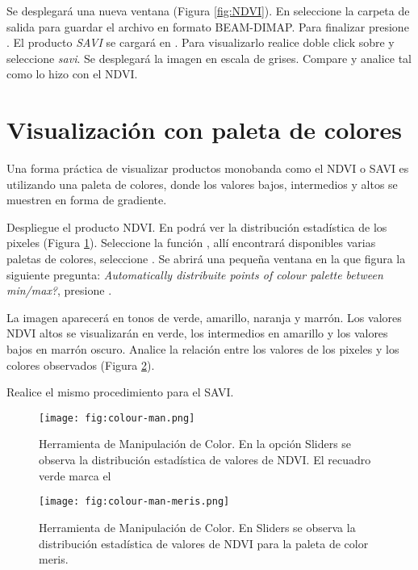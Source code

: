 Se desplegará una nueva ventana (Figura \ref{fig:NDVI}). En  seleccione la carpeta de salida para guardar el archivo en formato BEAM-DIMAP. Para finalizar presione . El producto \emph{SAVI} se cargará en . Para visualizarlo realice doble click sobre  y seleccione \emph{savi}. Se desplegará la imagen en escala de grises. Compare y analice tal como lo hizo con el NDVI.

\section{Visualización con paleta de colores}

Una forma práctica de visualizar productos monobanda como el NDVI o SAVI es utilizando una paleta de colores, donde los valores bajos, intermedios y altos se muestren en forma de gradiente.

Despliegue el producto NDVI. En  podrá ver la distribución estadística de los pixeles (Figura \ref{fig:color-man}). Seleccione la función , allí encontrará disponibles varias paletas de colores, seleccione . Se abrirá una pequeña ventana en la que figura la siguiente pregunta: \emph{Automatically distribuite points of colour palette between min/max?}, presione .

La imagen aparecerá en tonos de verde, amarillo, naranja y marrón. Los valores NDVI altos se visualizarán en verde, los intermedios en amarillo y los valores bajos en marrón oscuro. Analice la relación entre los valores de los pixeles y los colores observados (Figura \ref{fig:color-man-meris}).

Realice el mismo procedimiento para el SAVI.

\begin{figure}[h!]
    \centering
    \texttt{[image: fig:colour-man.png]}
    \caption{Herramienta de Manipulación de Color. En la opción Sliders se observa la distribución estadística de valores de NDVI. El recuadro verde marca el }
    \label{fig:color-man}
\end{figure}

\begin{figure}[h!]
    \centering
    \texttt{[image: fig:colour-man-meris.png]}
    \caption{Herramienta de Manipulación de Color. En Sliders se observa la distribución estadística de valores de NDVI para la paleta de color meris.}
    \label{fig:color-man-meris}
\end{figure}

